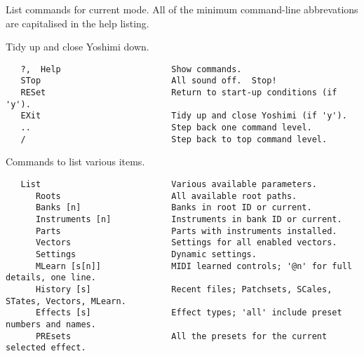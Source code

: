       List commands for current mode.  All of the minimum command-line
      abbrevations are capitalised in the help listing.

         Tidy up and close Yoshimi down.


\iffalse

\subsection{Command List}
\label{subsec:command_line_command_list}

   This section provides another list of CLI commands, and should be considered
   the most complete.  We will reconcile it all at some point.
   First, some general commands.  The capital letters denote the minimum token
   needed for each command.

\fi

\iffalse
\begin{verbatim}
   ?,  Help                      Show commands.
   STop                          All sound off.  Stop!
   RESet                         Return to start-up conditions (if 'y').
   EXit                          Tidy up and close Yoshimi (if 'y').
   ..                            Step back one command level.
   /                             Step back to top command level.
\end{verbatim}

   Commands to list various items.

\begin{verbatim}
   List                          Various available parameters.
      Roots                      All available root paths.
      Banks [n]                  Banks in root ID or current.
      Instruments [n]            Instruments in bank ID or current.
      Parts                      Parts with instruments installed.
      Vectors                    Settings for all enabled vectors.
      Settings                   Dynamic settings.
      MLearn [s[n]]              MIDI learned controls; '@n' for full details, one line.
      History [s]                Recent files; Patchsets, SCales, STates, Vectors, MLearn.
      Effects [s]                Effect types; 'all' include preset numbers and names.
      PREsets                    All the presets for the current selected effect.
\end{verbatim}

